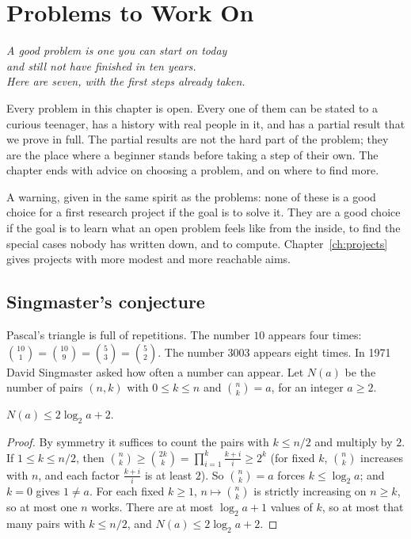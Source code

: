 \chapter{Problems to Work On}
\label{ch:problems}

\begin{center}\itshape
A good problem is one you can start on today\\
and still not have finished in ten years.\\
Here are seven, with the first steps already taken.
\end{center}

Every problem in this chapter is open. Every one of them can be stated to a curious teenager, has a history with real people in it, and has a partial result that we prove in full. The partial
results are not the hard part of the problem; they are the place where a beginner stands before taking a step of their own. The chapter ends with advice on choosing a problem, and on where to find more.

A warning, given in the same spirit as the problems: none of these is a good choice for a first research project if the goal is to solve it. They are a good choice if the goal is to learn what
an open problem feels like from the inside, to find the special cases nobody has written down, and to compute. Chapter~\ref{ch:projects} gives projects with more modest and more reachable aims.

\section{Singmaster's conjecture}

Pascal's triangle is full of repetitions. The number $10$ appears four times: $\binom{10}1=\binom{10}9=\binom53=\binom52$. The number $3003$ appears eight times. In 1971 David Singmaster asked how often a number can
appear. Let $N(a)$ be the number of pairs $(n,k)$ with $0\le k\le n$ and $\binom nk=a$, for an integer $a\ge2$.

\begin{proposition}[Singmaster, 1971]\label{prop:singmaster}
$N(a)\le2\log_2a+2$.
\end{proposition}

\begin{proof}
By symmetry it suffices to count the pairs with $k\le n/2$ and multiply by $2$. If $1\le k\le n/2$, then $\binom nk\ge\binom{2k}k=\prod_{i=1}^k\frac{k+i}i\ge2^k$ (for fixed $k$, $\binom nk$ increases with $n$, and each factor $\frac{k+i}i$ is at least $2$). So $\binom nk=a$ forces $k\le\log_2a$; and $k=0$ gives $1\ne a$. For each fixed $k\ge1$, $n\mapsto\binom nk$ is strictly increasing on $n\ge k$, so at most one $n$ works. There are at most $\log_2a+1$ values of $k$, so at most that many pairs with $k\le n/2$, and $N(a)\le2\log_2a+2$.
\end{proof}

